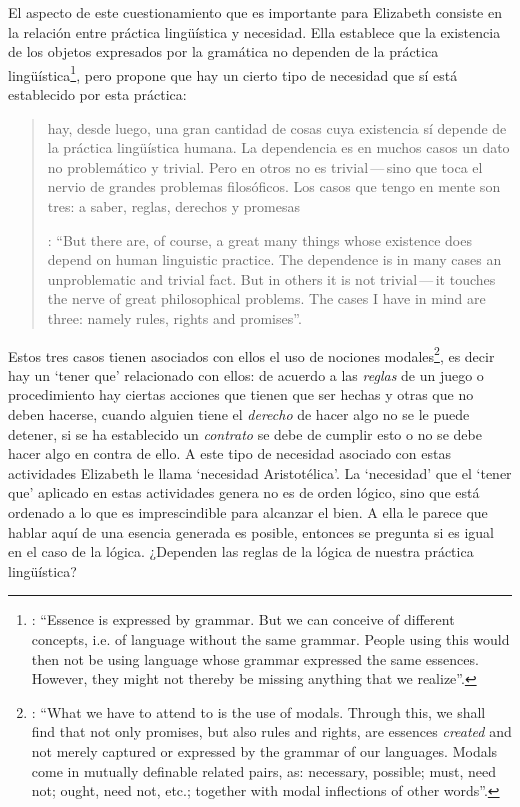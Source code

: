 El aspecto de este cuestionamiento que es importante para Elizabeth consiste en la relación entre práctica lingüística y necesidad. Ella establece que la existencia de los objetos expresados por la gramática no dependen de la práctica lingüística\footnote{\Cite[Cf.][115]{anscombe1981parmenides:qli}: \enquote{Essence is expressed by grammar. But we can conceive of different concepts, i.e. of language without the same grammar. People using this would then not be using language whose grammar expressed the same essences. However, they might not thereby be missing anything that we realize}.}, pero propone que hay un cierto tipo de necesidad que sí está establecido por esta práctica: \blockquote[{\Cite[118]{anscombe1981parmenides:qli}}: \enquote{But there are, of course, a great many things whose existence does depend on human linguistic practice. The dependence is in many cases an unproblematic and trivial fact. But in others it is not trivial\,---\,it touches the nerve of great philosophical problems. The cases I have in mind are three: namely rules, rights and promises}.]{hay, desde luego, una gran cantidad de cosas cuya existencia sí depende de la práctica lingüística humana. La dependencia es en muchos casos un dato no problemático y trivial. Pero en otros no es trivial\,---\,sino que toca el nervio de grandes problemas filosóficos. Los casos que tengo en mente son tres: a saber, reglas, derechos y promesas}. Estos tres casos tienen asociados con ellos el uso de nociones modales\footnote{\cite[Cf.][100]{anscombe1981erp:rrp}: \enquote{What we have to attend to is the use of modals. Through this, we shall find that not only promises, but also rules and rights, are essences \emph{created} and not merely captured or expressed by the grammar of our languages. Modals come in mutually definable related pairs, as: necessary, possible; must, need not; ought, need not, etc.; together with modal inflections of other words}.}, es decir hay un `tener que' relacionado con ellos: de acuerdo a las \emph{reglas} de un juego o procedimiento hay ciertas acciones que tienen que ser hechas y otras que no deben hacerse, cuando alguien tiene el \emph{derecho} de hacer algo no se le puede detener, si se ha establecido un \emph{contrato} se debe de cumplir esto o no se debe hacer algo en contra de ello. A este tipo de necesidad asociado con estas actividades Elizabeth le llama `necesidad Aristotélica'. La `necesidad' que el `tener que' aplicado en estas actividades genera no es de orden lógico, sino que está ordenado a lo que es imprescindible para alcanzar el bien. A ella le parece que hablar aquí de una esencia generada es posible, entonces se pregunta si es igual en el caso de la lógica. ¿Dependen las reglas de la lógica de nuestra práctica lingüística?

